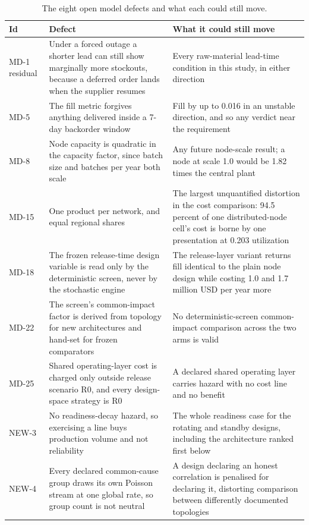 \begin{table}[htbp]
\centering
\caption{The eight open model defects and what each could still move.}
\label{tab:defects}
\footnotesize
\setlength{\tabcolsep}{5pt}
\begin{tabular}{@{}p{1.6cm}p{5.0cm}p{6.4cm}@{}}
\toprule
Id & Defect & What it could still move \\
\midrule
MD-1 residual & Under a forced outage a shorter lead can still show marginally more stockouts, because a deferred order lands when the supplier resumes & Every raw-material lead-time condition in this study, in either direction \\
MD-5 & The fill metric forgives anything delivered inside a 7-day backorder window & Fill by up to 0.016 in an unstable direction, and so any verdict near the requirement \\
MD-8 & Node capacity is quadratic in the capacity factor, since batch size and batches per year both scale & Any future node-scale result; a node at scale 1.0 would be 1.82 times the central plant \\
MD-15 & One product per network, and equal regional shares & The largest unquantified distortion in the cost comparison: 94.5 percent of one distributed-node cell's cost is borne by one presentation at 0.203 utilization \\
MD-18 & The frozen release-time design variable is read only by the deterministic screen, never by the stochastic engine & The release-layer variant returns fill identical to the plain node design while costing 1.0 and 1.7 million USD per year more \\
MD-22 & The screen's common-impact factor is derived from topology for new architectures and hand-set for frozen comparators & No deterministic-screen common-impact comparison across the two arms is valid \\
MD-25 & Shared operating-layer cost is charged only outside release scenario R0, and every design-space strategy is R0 & A declared shared operating layer carries hazard with no cost line and no benefit \\
NEW-3 & No readiness-decay hazard, so exercising a line buys production volume and not reliability & The whole readiness case for the rotating and standby designs, including the architecture ranked first below \\
NEW-4 & Every declared common-cause group draws its own Poisson stream at one global rate, so group count is not neutral & A design declaring an honest correlation is penalised for declaring it, distorting comparison between differently documented topologies \\
\bottomrule
\end{tabular}
\end{table}

